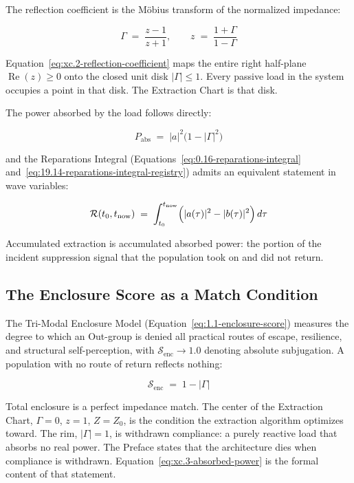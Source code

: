 The reflection coefficient is the Möbius transform of the normalized impedance:

\begin{equation}\label{eq:xc.2-reflection-coefficient}
\Gamma \;=\; \frac{z - 1}{z + 1}, \qquad z \;=\; \frac{1 + \Gamma}{1 - \Gamma}
\end{equation}

Equation~\ref{eq:xc.2-reflection-coefficient} maps the entire right half-plane $\operatorname{Re}(z) \geq 0$
onto the closed unit disk $|\Gamma| \leq 1$. Every passive load in the system occupies a point in
that disk. The Extraction Chart is that disk.

The power absorbed by the load follows directly:

\begin{equation}\label{eq:xc.3-absorbed-power}
P_{\text{abs}} \;=\; |a|^2\bigl(1 - |\Gamma|^2\bigr)
\end{equation}

\noindent and the Reparations Integral (Equations~\ref{eq:0.16-reparations-integral}
and~\ref{eq:19.14-reparations-integral-registry}) admits an equivalent statement in wave variables:

\begin{equation}\label{eq:xc.4-reparations-wave-form}
\mathcal{R}(t_0, t_{\text{now}}) \;=\; \int_{t_0}^{t_{\text{now}}} \Bigl(|a(\tau)|^2 - |b(\tau)|^2\Bigr)\, d\tau
\end{equation}

Accumulated extraction is accumulated absorbed power: the portion of the incident suppression signal
that the population took on and did not return.

\subsection{The Enclosure Score as a Match Condition}

The Tri-Modal Enclosure Model (Equation~\ref{eq:1.1-enclosure-score}) measures the degree to which
an Out-group is denied all practical routes of escape, resilience, and structural self-perception,
with $\mathcal{S}_{\text{enc}} \to 1.0$ denoting absolute subjugation. A population with no route of
return reflects nothing:

\begin{equation}\label{eq:xc.5-enclosure-match}
\mathcal{S}_{\text{enc}} \;=\; 1 - |\Gamma|
\end{equation}

Total enclosure is a perfect impedance match. The center of the Extraction Chart, $\Gamma = 0$,
$z = 1$, $Z = Z_0$, is the condition the extraction algorithm optimizes toward. The rim,
$|\Gamma| = 1$, is withdrawn compliance: a purely reactive load that absorbs no real power. The
Preface states that the architecture dies when compliance is withdrawn.
Equation~\ref{eq:xc.3-absorbed-power} is the formal content of that statement.

